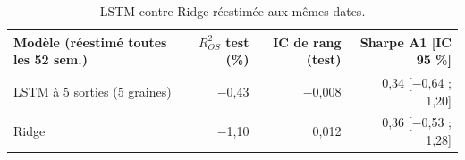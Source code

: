 \begin{table}[ht]
\centering
\small
\caption{LSTM contre Ridge réestimée aux mêmes dates.}
\label{tab:lstm}
\begin{tabular}{lrrr}
\toprule
Modèle (réestimé toutes les 52 sem.) & $R^2_{OS}$ test (\%) & IC de rang (test) & Sharpe A1 [IC 95 \%] \\
\midrule
LSTM à 5 sorties (5 graines) & $-$0,43 & $-$0,008 & 0,34 [$-$0,64 ; 1,20] \\
Ridge & $-$1,10 & 0,012 & 0,36 [$-$0,53 ; 1,28] \\
\bottomrule
\end{tabular}
\end{table}
